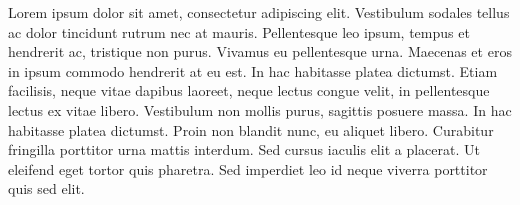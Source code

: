 Lorem ipsum dolor sit amet, consectetur adipiscing elit. Vestibulum sodales tellus ac dolor tincidunt rutrum nec at mauris. Pellentesque leo ipsum, tempus et hendrerit ac, tristique non purus. Vivamus eu pellentesque urna. Maecenas et eros in ipsum commodo hendrerit at eu est. In hac habitasse platea dictumst. Etiam facilisis, neque vitae dapibus laoreet, neque lectus congue velit, in pellentesque lectus ex vitae libero. Vestibulum non mollis purus, sagittis posuere massa. In hac habitasse platea dictumst. Proin non blandit nunc, eu aliquet libero. Curabitur fringilla porttitor urna mattis interdum. Sed cursus iaculis elit a placerat. Ut eleifend eget tortor quis pharetra. Sed imperdiet leo id neque viverra porttitor quis sed elit.